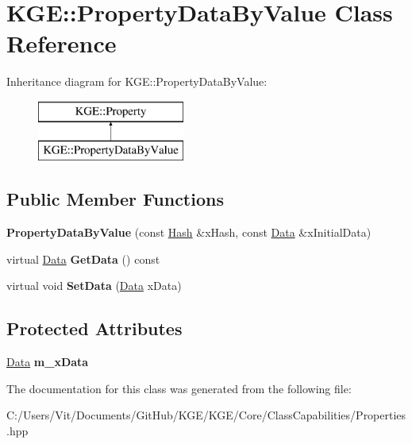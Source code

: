 \hypertarget{class_k_g_e_1_1_property_data_by_value}{\section{K\-G\-E\-:\-:Property\-Data\-By\-Value Class Reference}
\label{class_k_g_e_1_1_property_data_by_value}
}
Inheritance diagram for K\-G\-E\-:\-:Property\-Data\-By\-Value\-:\begin{figure}[H]
\begin{center}
\leavevmode
\includegraphics[height=2.000000cm]{class_k_g_e_1_1_property_data_by_value}
\end{center}
\end{figure}
\subsection*{Public Member Functions}
\begin{DoxyCompactItemize}
\item 
\hypertarget{class_k_g_e_1_1_property_data_by_value_ae6ab7e136376d75139ef09604b560a5e}{{\bfseries Property\-Data\-By\-Value} (const \hyperlink{class_k_g_e_1_1_hash}{Hash} \&x\-Hash, const \hyperlink{class_k_g_e_1_1_data}{Data} \&x\-Initial\-Data)}\label{class_k_g_e_1_1_property_data_by_value_ae6ab7e136376d75139ef09604b560a5e}

\item 
\hypertarget{class_k_g_e_1_1_property_data_by_value_a44144d25d9ec4131be7e78ffb6e4251d}{virtual \hyperlink{class_k_g_e_1_1_data}{Data} {\bfseries Get\-Data} () const }\label{class_k_g_e_1_1_property_data_by_value_a44144d25d9ec4131be7e78ffb6e4251d}

\item 
\hypertarget{class_k_g_e_1_1_property_data_by_value_abf7fed6702ea0ec5ae9ddc532b7b16f3}{virtual void {\bfseries Set\-Data} (\hyperlink{class_k_g_e_1_1_data}{Data} x\-Data)}\label{class_k_g_e_1_1_property_data_by_value_abf7fed6702ea0ec5ae9ddc532b7b16f3}

\end{DoxyCompactItemize}
\subsection*{Protected Attributes}
\begin{DoxyCompactItemize}
\item 
\hypertarget{class_k_g_e_1_1_property_data_by_value_ae72b8e5e5acada86cb5ad0c5b1ea007e}{\hyperlink{class_k_g_e_1_1_data}{Data} {\bfseries m\-\_\-x\-Data}}\label{class_k_g_e_1_1_property_data_by_value_ae72b8e5e5acada86cb5ad0c5b1ea007e}

\end{DoxyCompactItemize}


The documentation for this class was generated from the following file\-:\begin{DoxyCompactItemize}
\item 
C\-:/\-Users/\-Vit/\-Documents/\-Git\-Hub/\-K\-G\-E/\-K\-G\-E/\-Core/\-Class\-Capabilities/Properties.\-hpp\end{DoxyCompactItemize}
